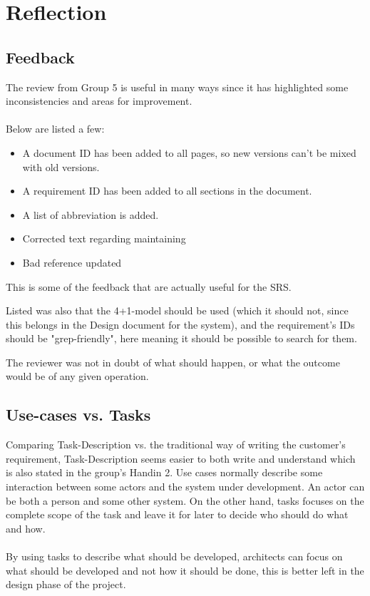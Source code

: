 \documentclass[Main]{subfiles}
\begin{document}
\chapter{Reflection}

\section{Feedback}

The review from Group 5 is useful in many ways since it has highlighted some inconsistencies and areas for improvement.
\\
\\
Below are listed a few:

\begin{itemize}

\item A document ID has been added to all pages, so new versions can't be mixed with old versions.

\item A requirement ID has been added to all sections in the document.

\item A list of abbreviation is added.

\item Corrected text regarding maintaining

\item Bad reference updated 

\end{itemize}
This is some of the feedback that are actually useful for the SRS.

Listed was also that the 4+1-model should be used (which it should not, since this belongs in the Design document for the system), and the requirement's IDs should be "grep-friendly", here meaning it should be possible to search for them.

The reviewer was not in doubt of what should happen, or what the outcome would be of any given operation.



\section{Use-cases vs. Tasks}

Comparing Task-Description vs. the traditional way of writing the customer's requirement, Task-Description seems easier to both write and understand which is also stated in the group's Handin 2\cite[p. 2]{HI2}.
Use cases normally describe some interaction between some actors and the system under development.
An actor can be both a person and some other system.
On the other hand, tasks focuses on the complete scope of the task and leave it for later to decide who should do what and how\cite[p. 3]{HI2}.
\\
\\
By using tasks to describe what should be developed, architects can focus on what should be developed and not how it should be done, this is better left in the design phase of the project.
\end{document}
